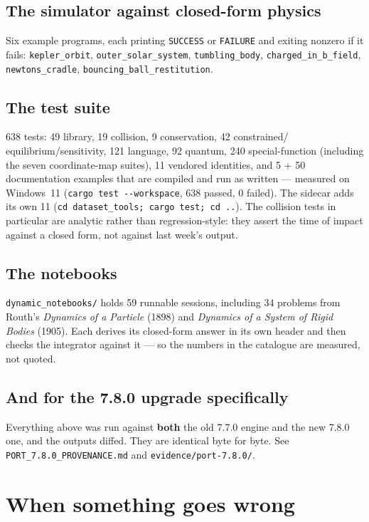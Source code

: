 \documentclass[11pt]{article}
\newcommand{\code}[1]{\texttt{#1}}
\begin{document}
\subsection{The simulator against closed-form physics}

Six example programs, each printing \code{SUCCESS} or \code{FAILURE} and
exiting nonzero if it fails: \code{kepler\_orbit},
\code{outer\_solar\_system}, \code{tumbling\_body},
\code{charged\_in\_b\_field}, \code{newtons\_cradle},
\code{bouncing\_ball\_restitution}.

\subsection{The test suite}

638 tests: 49 library, 19 collision, 9 conservation, 42 constrained/
equilibrium/sensitivity, 121 language, 92 quantum, 240 special-function
(including the seven coordinate-map suites), 11 vendored identities,
and 5 + 50 documentation examples that are compiled and run as written
--- measured on Windows~11 (\code{cargo test -{}-workspace}, 638 passed,
0 failed). The sidecar adds its own 11 (\code{cd dataset\_tools; cargo
test; cd ..}). The
collision tests in particular are analytic rather than
regression-style: they assert the time of impact against a closed form,
not against last week's output.

\subsection{The notebooks}

\code{dynamic\_notebooks/} holds 59 runnable sessions, including 34
problems from Routh's \emph{Dynamics of a Particle} (1898) and
\emph{Dynamics of a System of Rigid Bodies} (1905). Each derives its
closed-form answer in its own header and then checks the integrator
against it --- so the numbers in the catalogue are measured, not quoted.

\subsection{And for the 7.8.0 upgrade specifically}

Everything above was run against \textbf{both} the old 7.7.0 engine and
the new 7.8.0 one, and the outputs diffed. They are identical byte for
byte. See \code{PORT\_7.8.0\_PROVENANCE.md} and
\code{evidence/port-7.8.0/}.

\section{When something goes wrong}
\end{document}
